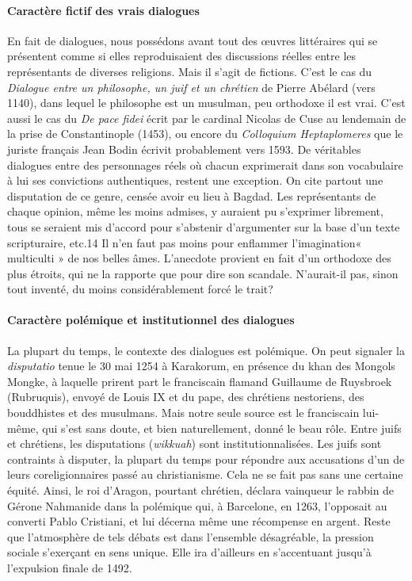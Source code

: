\paragraph{Caractère fictif des vrais dialogues}
En fait de dialogues, nous possédons avant tout des œuvres littéraires qui se présentent comme si elles reproduisaient des discussions réelles entre les représentants de diverses religions. Mais il s'agit de fictions. C'est le cas du \textit{Dialogue entre un philosophe, un juif et un chrétien} de Pierre Abélard (vers 1140), dans lequel le philosophe est un musulman, peu orthodoxe il est vrai. C'est aussi le cas du \textit{De pace fidei} écrit par le cardinal Nicolas de Cuse au lendemain de la prise de Constantinople (1453), ou encore du \textit{Colloquium Heptaplomeres} que le juriste français Jean Bodin écrivit probablement vers 1593.
De véritables dialogues entre des personnages réels où chacun exprimerait dans son vocabulaire à lui ses convictions authentiques, restent une exception. On cite partout une disputation de ce genre, censée avoir eu lieu à Bagdad. Les représentants de chaque opinion, même les moins admises, y auraient pu s'exprimer librement, tous se seraient mis d'accord pour s'abstenir d'argumenter sur la base d'un texte scripturaire, etc.14 Il n'en faut pas moins pour enflammer l'imagination« multiculti » de nos belles âmes. L'anecdote provient en fait d'un orthodoxe des plus étroits, qui ne la rapporte que pour
dire son scandale. N'aurait-il pas, sinon tout inventé, du moins considérablement forcé le trait?

\paragraph{Caractère polémique et institutionnel des dialogues}
La plupart du temps, le contexte des dialogues est polémique. On peut signaler la \textit{disputatio} tenue le 30 mai 1254 à Karakorum, en présence du khan des Mongols Mongke, à laquelle prirent part le franciscain flamand Guillaume de Ruysbroek (Rubruquis), envoyé de Louis IX et du pape, des chrétiens nestoriens, des bouddhistes et des musulmans. Mais notre seule source est le franciscain lui-même, qui s'est sans doute, et bien naturellement, donné le beau rôle.
Entre juifs et chrétiens, les disputations (\textit{wikkuah}) sont institutionnalisées. Les juifs sont contraints à disputer, la plupart du temps pour répondre aux accusations d'un de leurs coreligionnaires passé au christianisme. Cela ne se fait pas sans une certaine équité. Ainsi, le roi d'Aragon, pourtant chrétien, déclara vainqueur le rabbin de Gérone Nahmanide dans la polémique qui, à Barcelone, en 1263, l'opposait au converti Pablo Cristiani, et lui décerna même une récompense en argent. Reste que l'atmosphère de tels débats est dans l'ensemble désagréable, la pression sociale s'exerçant en sens unique. Elle ira d'ailleurs en s'accentuant jusqu'à l'expulsion finale de 1492.

